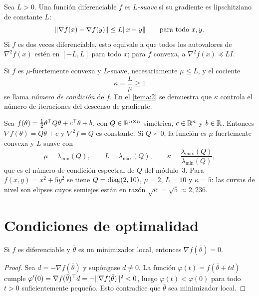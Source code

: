 \begin{definicion}\label{def:suave}
Sea $L>0$. Una función diferenciable $f$ es \emph{$L$-suave} si su gradiente es lipschitziano de constante $L$:
\[
\lVert\nabla f(x)-\nabla f(y)\rVert\le L\lVert x-y\rVert\qquad\text{para todo } x,y.
\]
Si $f$ es dos veces diferenciable, esto equivale a que todos los autovalores de $\nabla^{2}f(x)$ estén en $[-L,L]$ para todo $x$; para $f$ convexa, a $\nabla^{2}f(x)\preceq LI$.
\end{definicion}

Si $f$ es $\mu$-fuertemente convexa y $L$-suave, necesariamente $\mu\le L$, y el cociente
\[
\kappa=\frac{L}{\mu}\ge 1
\]
se llama \emph{número de condición} de $f$. En el \cref{tema:2} se demuestra que $\kappa$ controla el número de iteraciones del descenso de gradiente.

\begin{ejemplo}\label{ej:cuadratica}
Sea $f(\theta)=\tfrac12\theta^{\top} Q\theta+c^{\top}\theta+b$, con $Q\in\mathbb{R}^{n\times n}$ simétrica, $c\in\mathbb{R}^{n}$ y $b\in\mathbb{R}$. Entonces $\nabla f(\theta)=Q\theta+c$ y $\nabla^{2}f=Q$ es constante. Si $Q\succ 0$, la función es $\mu$-fuertemente convexa y $L$-suave con
\[
\mu=\lambda_{\min}(Q),\qquad L=\lambda_{\max}(Q),\qquad \kappa=\frac{\lambda_{\max}(Q)}{\lambda_{\min}(Q)},
\]
que es el número de condición espectral de $Q$ del módulo~3. Para $f(x,y)=x^{2}+5y^{2}$ se tiene $Q=\operatorname{diag}(2,10)$, $\mu=2$, $L=10$ y $\kappa=5$: las curvas de nivel son elipses cuyos semiejes están en razón $\sqrt\kappa=\sqrt5\approx 2{,}236$.
\end{ejemplo}

\section{Condiciones de optimalidad}

\begin{teorema}\label{teo:fermat}
Si $f$ es diferenciable y $\bar\theta$ es un minimizador local, entonces $\nabla f(\bar\theta)=0$.
\end{teorema}

\begin{proof}
Sea $d=-\nabla f(\bar\theta)$ y supóngase $d\ne 0$. La función $\varphi(t)=f(\bar\theta+td)$ cumple $\varphi'(0)=\nabla f(\bar\theta)^{\top} d=-\lVert\nabla f(\bar\theta)\rVert^{2}<0$, luego $\varphi(t)<\varphi(0)$ para todo $t>0$ suficientemente pequeño. Esto contradice que $\bar\theta$ sea minimizador local.
\end{proof}

